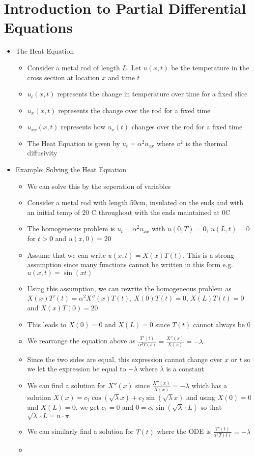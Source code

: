 \documentclass[12pt]{article}
\begin{document}
\section{Introduction to Partial Differential Equations}

\begin{itemize}
    \item The Heat Equation \begin{itemize}
        \item Consider a metal rod of length $L$. Let $u(x,t)$ be the temperature in the cross section at location $x$ and time $t$
        \item $u_t(x,t)$ represents the change in temperature over time for a fixed slice
        \item $u_x(x,t)$ represents the change over the rod for a fixed time
        \item $u_{xx}(x,t)$ represents how $u_x(t)$ changes over the rod for a fixed time
        \item The Heat Equation is given by $u_t = \alpha^2 u_{xx}$ where $a^2$ is the thermal diffusivity
    \end{itemize}
    \item Example: Solving the Heat Equation \begin{itemize}
        \item We can solve this by the seperation of variables
        \item Consider a metal rod with length 50cm, insulated on the ends and with an initial temp of 20 C throughout with the ends maintained at 0C
        \item The homogeneous problem is $u_t = \alpha^2 u_{xx}$ with $u(0, T) = 0$, $u(L,t) = 0$ for $t>0$ and $u(x,0) = 20$
        \item Assume that we can write $u(x,t) = X(x) T(t)$. This is a strong assumption since many functions cannot be written in this form e.g. $u(x,t) = \sin (xt)$
        \item Using this assumption, we can rewrite the homogeneous problem as $X(x) T'(t) = \alpha^2 X''(x) T(t)$, $X(0)T(t) = 0$, $X(L)T(t) = 0$ and $X(x)T(0) = 20$
        \item This leads to $X(0) = 0$ and $X(L) = 0$ since $T(t)$ cannot always be 0
        \item We rearrange the equation above as $\frac{T'(t)}{\alpha^2 T(t)} = \frac{X''(x)}{X(x)} = - \lambda$
        \item Since the two sides are equal, this expression cannot change over $x$ or $t$ so we let the expression be equal to $- \lambda$ where $\lambda$ is a constant
        \item We can find a solution for $X''(x)$ since $\frac{X''(x)}{X(x)} = - \lambda$ which has a solution $X(x) = c_1 \cos (\sqrt{\lambda} x) + c_2 \sin (\sqrt{\lambda} x)$ and using $X(0) = 0$ and $X(L) = 0$, we get $c_1 =0$ and $0 = c_2 \sin (\sqrt{\lambda} \cdot L)$ so that $\sqrt{\lambda} \cdot L = n \cdot \pi$
        \item We can similarly find a solution for $T(t)$ where the ODE is $\frac{T'(t)}{\alpha^2 T(t)} = - \lambda$
        \item 
    \end{itemize}
\end{itemize}
\end{document}
